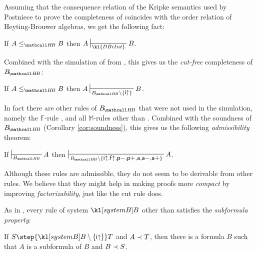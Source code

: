 Assuming that the consequence relation of the Kripke semantics used by Postniece
to prove the completeness of  coincides with the order relation of
Heyting-Brouwer algebras, we get the following fact:

\begin{fact}
  If $A \sementHB B$ then $A \prov{\kl{DBiInt}} B$.
\end{fact}

Combined with the simulation of  from ,
this gives us the \emph{cut-free} completeness of $\sysBHB$:

\begin{theorem}
  If $A \sementHB B$ then $A \prov{\sysBHB \setminus \{\rsf{i{\ua}}\}} B$.
\end{theorem}

In fact there are other rules of $\sysBHB$ that were not used in the simulation,
namely the $\mathbb{F}$-rule , and all $\mathbb{M}$-rules other
than . Combined with the soundness of $\sysBHB$ (Corollary
\ref{cor:soundness}), this gives us the following \emph{admissibility} theorem:

\begin{theorem}[Admissibility]

  If $\prov{\sysBHB} A$ then $\prov{\sysBHB \setminus
  \{\rsf{i{\ua}},\rsf{f{\ua}},\rsf{p{-}},\rsf{p{+}},\rsf{a},\rsf{a{-}},\rsf{a{+}}\}}
  A$.
\end{theorem}

Although these rules are admissible, they do not seem to be derivable from other
rules. We believe that they might help in making proofs more \emph{compact} by
improving \emph{factorizability}, just like the cut rule does.

As in , every rule of system $\sysB$ other than
 satisfies the \emph{subformula property}:

\begin{fact}\label{cor:subformula-property} If $S
  \step{\sysB \setminus \{\rsf{i{\ua}}\}} T$ and $A \prec T$, then there is a
  formula $B$ such that $A$ is a subformula of $B$ and $B \prec S$.
\end{fact}


